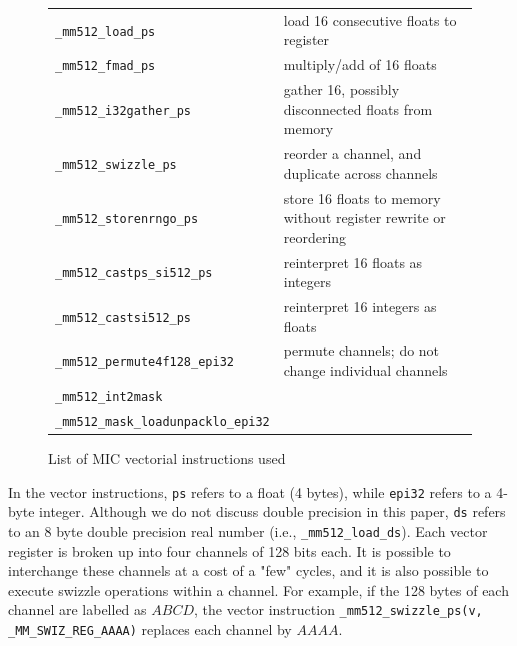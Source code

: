 \documentclass[10pt,conference,compsocconf]{IEEEtran}
\def\blue#1{\textbf{\textcolor{blue}{#1}}}
\def\qes#1{{\blue{*** For Erik: #1 ***}}}
\def\ttt#1{{\tt #1}}
\def\qes#1{}
\begin{document}
\def\loadps{\ttt{\_mm512\_load\_ps}}
\def\loadds{\ttt{\_mm512\_load\_ds}}
\def\fmadps{\ttt{\_mm512\_fmad\_ps}}
\def\gatherps{\ttt{\_mm512\_i32gather\_ps}}
\def\swizzleps{\ttt{\_mm512\_swizzle\_ps}}
\def\storenrngops{\ttt{\_mm512\_storenrngo\_ps}}
\def\castsi{\ttt{\_mm512\_castsi512\_ps}}
\def\permute{\ttt{\_mm512\_permute4f128\_epi32}}
\def\intmask{\ttt{\_mm512\_int2mask}}
\def\loadunpack{\ttt{\_mm512\_mask\_loadunpacklo\_epi32}}
\def\castitops{\ttt{\_mm512\_castsi512\_ps}}
\def\castpstoi{\ttt{\_mm512\_castps\_si512\_ps}}

\begin{figure}
  \begin{center}
    \begin{tabular}{|l|l|}
      \hline
      \loadps &  load 16 consecutive floats to register\\
      \fmadps &  multiply/add of 16 floats\\
      \gatherps &  gather 16, possibly disconnected floats from memory\\
      \swizzleps &  reorder a channel, and duplicate across channels\\
      \storenrngops &  store 16 floats to memory without register rewrite or reordering\\
      \castpstoi & reinterpret 16 floats as integers\\
      \castitops & reinterpret 16 integers as floats\\
      \permute &  permute channels; do not change individual channels\\
      \intmask &  \\
      \loadunpack &  \\
      \hline
    \end{tabular}
  \end{center}
  \caption{List of MIC vectorial instructions used}
\end{figure}
In the vector instructions, \ttt{ps} refers to a float (4 bytes),
while \ttt{epi32} refers to a 4-byte integer. Although we do not
discuss double precision in this paper, \ttt{ds} refers to an 8 byte
double precision real number (i.e., \loadds).  Each vector register is
broken up into four channels of 128 bits each. It is possible to
interchange these channels at a cost of a "few" \qes{exact numbers?}
cycles, and it is also possible to execute swizzle operations within a
channel. For example, if the 128 bytes of each channel are labelled as
$ABCD$, the vector instruction \ttt{\_mm512\_swizzle\_ps(v,
  \_MM\_SWIZ\_REG\_AAAA)} replaces each channel by $AAAA$.
\end{document}
